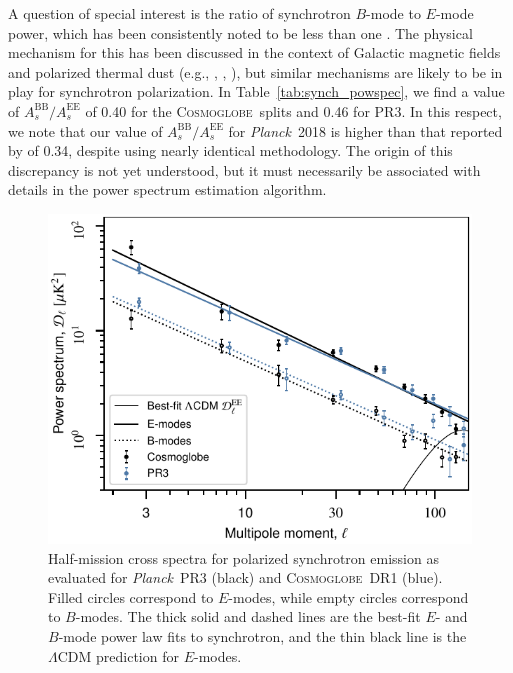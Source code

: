 \documentclass[twocolumn]{../../common/aa}
\def\Planck{\emph{Planck}}
\newcommand{\cosmoglobe}{\textsc{Cosmoglobe}}
\begin{document}
A question of special interest is the ratio of synchrotron $B$-mode to $E$-mode power, which has been consistently noted to be less than one \citep{page2007,planck2014-a12,planck2016-l04,krachmalnicoff2018,QUIJOTE_IV,eimer2023}. The physical mechanism for this has been discussed in the context of Galactic magnetic fields and polarized thermal dust (e.g., \citealp{kandel2017}, \citealp{so_galsci}, \citealp{vacher2023}), but similar mechanisms are likely to be in play for synchrotron polarization. In Table~\ref{tab:synch_powspec}, we find a value of $A_s^\mathrm{BB}/A_s^\mathrm{EE}$ of 0.40 for the \cosmoglobe\ splits and 0.46 for PR3. In this respect, we note that our value of $A_s^\mathrm{BB}/A_s^\mathrm{EE}$ for \Planck\ 2018 is higher than that reported by \citet{planck2016-l04} of 0.34, despite using nearly identical methodology. The origin of this discrepancy is not yet understood, but it must necessarily be associated with details in  the power spectrum estimation algorithm. %

\begin{figure}
        \centering
	\includegraphics[width=\linewidth]{figures/cls_synch_ratio.pdf}
        \caption{
		Half-mission cross spectra for polarized synchrotron emission as evaluated for \Planck\ PR3 (black) and \cosmoglobe\ DR1 (blue). Filled circles correspond to $E$-modes, while empty circles correspond to $B$-modes. The thick solid and dashed lines are the best-fit $E$- and $B$-mode power law fits to synchrotron, and the thin black line is the $\Lambda$CDM prediction for $E$-modes.
        }
        \label{fig:spectra}
\end{figure}
\end{document}

